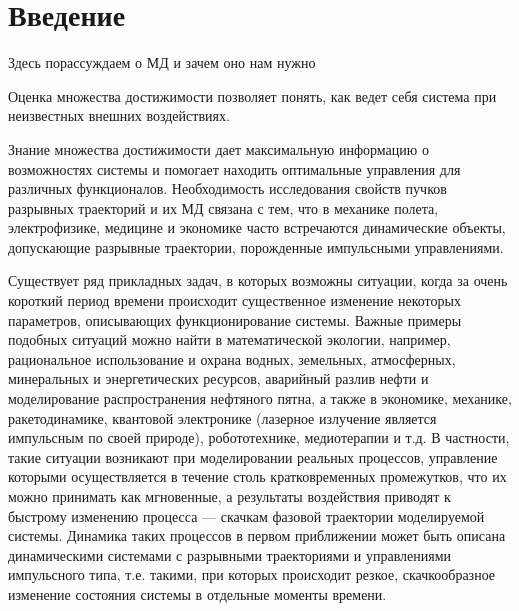\chapter*{Введение}
\label{intro}

Здесь порассуждаем о МД и зачем оно нам нужно 


Оценка множества достижимости позволяет понять, как ведет себя система
при неизвестных внешних воздействиях.


Знание множества достижимости дает максимальную информацию о
возможностях системы и помогает находить оптимальные управления для
различных функционалов. Необходимость  исследования свойств пучков
разрывных траекторий и их МД связана с тем, что в механике полета,
электрофизике, медицине и экономике часто встречаются динамические
объекты, допускающие разрывные траектории, порожденные импульсными
управлениями.


Существует ряд прикладных задач, в которых возможны ситуации, когда за
очень короткий период времени происходит существенное изменение
некоторых параметров, описывающих функционирование системы.  Важные
примеры подобных ситуаций можно найти в математической экологии,
например, рациональное использование и охрана водных, земельных,
атмосферных, минеральных и энергетических ресурсов, аварийный разлив
нефти и моделирование распространения нефтяного пятна,  а также в
экономике, механике, ракетодинамике,  квантовой электронике (лазерное
излучение является импульсным по своей природе), робототехнике,
медиотерапии  и т.д. В частности, такие ситуации возникают при
моделировании реальных процессов, управление которыми осуществляется в
течение столь кратковременных промежутков, что их можно принимать как
мгновенные, а результаты воздействия приводят к быстрому изменению
процесса --- скачкам фазовой траектории моделируемой системы. Динамика
таких процессов в первом приближении может быть описана динамическими
системами  с разрывными траекториями и управлениями импульсного типа,
т.е. такими, при которых происходит резкое, скачкообразное изменение
состояния системы в отдельные моменты времени. 
